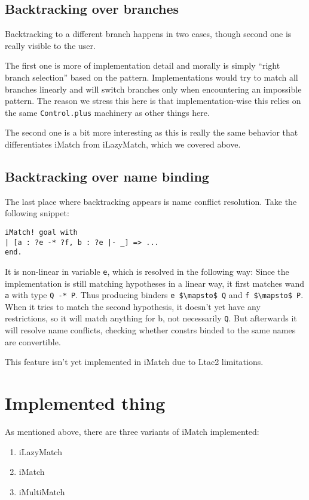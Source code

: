 \subsection{Backtracking over branches}

Backtracking to a different branch happens in two cases, though second one is really visible to the user.

The first one is more of implementation detail and morally is simply ``right branch selection'' based on the pattern.
Implementations would try to match all branches linearly and will switch branches only when encountering an impossible pattern.
The reason we stress this here is that implementation-wise this relies on the same \lstinline|Control.plus| machinery as other things here.

The second one is a bit more interesting as this is really the same behavior that differentiates iMatch from iLazyMatch, which we covered above.

\subsection{Backtracking over name binding}

The last place where backtracking appears is name conflict resolution.
Take the following snippet:

\begin{lstlisting}
iMatch! goal with
| [a : ?e -* ?f, b : ?e |- _] => ...
end.
\end{lstlisting}

It is non-linear in variable \lstinline|e|, which is resolved in the following way:
Since the implementation is still matching hypotheses in a linear way, it first matches wand \lstinline|a| with type \lstinline|Q -* P|.
Thus producing binders \lstinline|e $\mapsto$ Q| and \lstinline|f $\mapsto$ P|.
When it tries to match the second hypothesis, it doesn't yet have any restrictions, so it will match anything for b, not necessarily \lstinline|Q|.
But afterwards it will resolve name conflicts, checking whether constrs binded to the same names are convertible.

This feature isn't yet implemented in iMatch due to Ltac2 limitations.

\section{Implemented thing}

As mentioned above, there are three variants of iMatch implemented:
\begin{enumerate}
\item iLazyMatch
\item iMatch
\item iMultiMatch
\end{enumerate}

